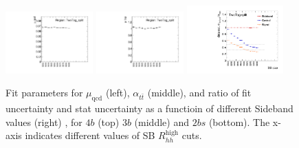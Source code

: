 \begin{figure}[htbp!]
\begin{center}
\includegraphics[width=0.3\textwidth,angle=-90]{figures/boosted/Appendix_SB/TwoTag_split_muqcdSB.pdf}
\includegraphics[width=0.3\textwidth,angle=-90]{figures/boosted/Appendix_SB/TwoTag_split_mutopSB.pdf}
\includegraphics[width=0.33\textwidth,angle=-90]{figures/boosted/Appendix_SB/data_est_TwoTag_split_sigma_compareSB.pdf}
  \caption{Fit parameters for $\mu_{\text{qcd}}$ (left), $\alpha_{t\bar{t}}$ (middle), and ratio of fit uncertainty and stat uncertainty as a functioin of different Sideband values (right) , for $4b$ (top) $3b$ (middle) and $2bs$ (bottom). The x-axis indicates different values of SB $R_{hh}^{\text{high}}$ cuts.}
  \label{fig:app-sb-muqcd-diffSB}
\end{center}
\end{figure}



